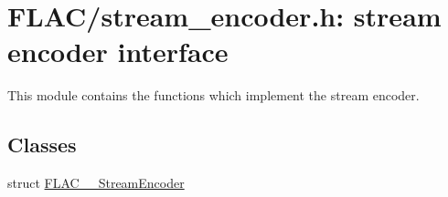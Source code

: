 \hypertarget{group__flac__stream__encoder}{}\section{F\+L\+A\+C/stream\+\_\+encoder.h\+: stream encoder interface}
\label{group__flac__stream__encoder}


This module contains the functions which implement the stream encoder.  


\subsection*{Classes}
\begin{DoxyCompactItemize}
\item 
struct \mbox{\hyperlink{struct_f_l_a_c_____stream_encoder}{F\+L\+A\+C\+\_\+\+\_\+\+Stream\+Encoder}}
\end{DoxyCompactItemize}
